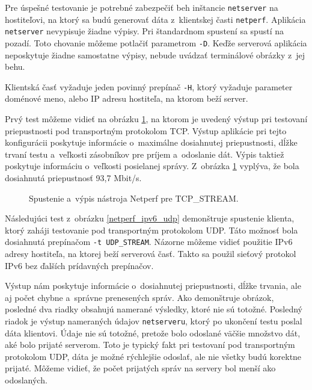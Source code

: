         Pre úspešné testovanie je potrebné zabezpečiť beh
        inštancie \texttt{netserver} na hostiteľovi, na ktorý sa budú
        generovať dáta z~klientskej časti \texttt{netperf}.
        Aplikácia \texttt{netserver} nevypisuje žiadne výpisy. Pri štandardnom spustení sa spustí
        na pozadí. Toto chovanie môžeme potlačiť parametrom \texttt{-D}. Keďže
        serverová aplikácia neposkytuje žiadne samostatne výpisy, nebude
        uvádzať terminálové obrázky z~jej behu.

        Klientská časť vyžaduje jeden povinný prepínač \texttt{-H}, ktorý
        vyžaduje parameter doménové meno, alebo IP adresu hostiteľa, na
        ktorom beží server.

        Prvý test môžeme vidieť na obrázku \ref{netperf_l_90}, na ktorom
        je uvedený výstup pri testovaní priepustnosti pod transportným
        protokolom TCP. Výstup aplikácie pri
        tejto konfigurácii poskytuje informácie o~maximálne dosiahnutej
        priepustnosti, dĺžke trvaní testu a~veľkosti zásobníkov pre 
        príjem a~odoslanie dát. Výpis taktiež poskytuje informáciu 
        o~veľkosti posielanej správy. Z~obrázka \ref{netperf_l_90} vyplýva, že
        bola dosiahnutá priepustnosť 93,7 Mbit/s.

       \begin{figure}[H]
           \begin{center}
               \caption{Spustenie a~výpis nástroja Netperf pre TCP\_STREAM.}
               \label{netperf_l_90}
           \end{center}
       \end{figure}

       Následujúci test z~obrázku \ref{netperf_ipv6_udp} demonštruje spustenie
       klienta, ktorý zaháji testovanie pod transportným protokolom UDP. Táto
       možnosť bola dosiahnutá prepínačom \texttt{-t UDP\_STREAM}. Názorne
       môžeme vidieť použitie IPv6 adresy hostiteľa, na ktorej beží serverová
       časť. Takto sa použil sieťový protokol IPv6 bez ďalších prídavných 
       prepínačov.

       Výstup nám poskytuje informácie o~dosiahnutej priepustnosti, dĺžke
       trvania, ale aj počet chybne a~správne prenesených správ. Ako demonštruje
       obrázok, posledné dva riadky obsahujú namerané výsledky, ktoré nie sú
       totožné. Posledný riadok je výstup nameraných údajov \texttt{netserveru}, ktorý
       po ukončení testu poslal dáta klientovi. Údaje nie sú totožné, pretože
       bolo odoslané väčšie množstvo dát, aké bolo prijaté serverom. Toto je
       typický fakt pri testovaní pod transportným protokolom UDP, dáta je možné
       rýchlejšie odoslať, ale nie všetky budú korektne prijaté. Môžeme vidieť,
       že počet prijatých správ na servery bol menší ako odoslaných.

